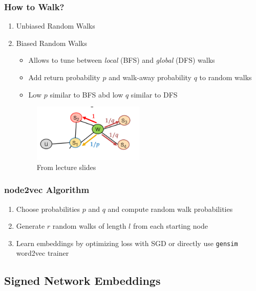 \documentclass{beamer}
\begin{document}
\begin{frame}
    \frametitle{How to Walk?}
    \begin{enumerate}
        \item Unbiased Random Walks \cite{Perozzi_2014}
        \item Biased Random Walks \cite{Grover_2016}
        \begin{itemize}
            \item Allows to tune between \textit{local} (BFS) and \textit{global} (DFS) walks
            \item Add return probability  $p$ and walk-away probability $q$ to random walks
            \item Low $p$ similar to BFS abd low $q$ similar to DFS
        \end{itemize}
        \begin{figure}[htp]
            \centering
            \includegraphics[width=0.5\textwidth]{images/biased-walk.png}
            \caption{From lecture slides \cite{Leskovec2018cs224w}}
        \end{figure}
    \end{enumerate}
    
\end{frame}

\begin{frame}
    \frametitle{node2vec Algorithm}
    \begin{enumerate}
        \item Choose probabilities $p$ and $q$ and compute random walk probabilities 
        \item Generate $r$ random walks of length $l$ from each starting node
        \item Learn embeddings by optimizing loss with SGD or directly use \texttt{gensim} word2vec trainer
    \end{enumerate}
    

\end{frame}
\subsection{Signed Network Embeddings}
\end{document}
